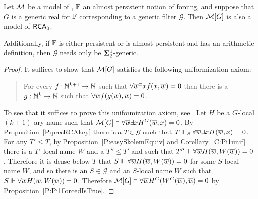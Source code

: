 \begin{thm}\label{T:presRCA}
Let $\mathcal{M}$ be a model of \RCAo, $\mathbb{F}$ an almost persistent notion of forcing,
and suppose that $G$ is a generic real for $\mathbb{F}$
corresponding to a generic filter $\mathcal{G}$.
Then $\mathcal{M}[G]$ is also a model of $\mathsf{RCA}_0$.

Additionally, if $\mathbb{F}$ is either persistent or is almost persistent
and has an arithmetic definition, then $\mathcal{G}$ needs only be
$\mathbf{\Sigma}^1_2$-generic.
\end{thm}
\begin{proof}
It suffices to show that $\mathcal{M}[G]$ satisfies
the following uniformization axiom:
\begin{quote}
For every $f:\mathbb{N}^{k+1}\to\mathbb{N}$ such that $\forall\overline{w}\exists xf(x,\overline{w})=0$
then there is a $g:\mathbb{N}^k\to\mathbb{N}$ such that $\forall\overline{w}f(g(\overline{w}),\overline{w})=0$.
\end{quote}
To see that it suffices to prove this uniformization axiom, see \cite{varMathias}.
Let $H$ be a $G$-local $(k+1)$-ary name such that
$\mathcal{M}[G]\vDash\forall\overline{w}\exists xH^G(\overline{w},x)=0$.
By Proposition~\ref{P:presRCAkey} there is a $T\in\mathcal{G}$
such that $T\Vdash_S \forall\overline{w}\exists xH(\overline{w},x)=0$.
For any $T'\leq T$, by Proposition~\ref{P:easySkolemEquiv} and Corollary~\ref{C:Pi1unif}
there is a $T'$ local name $W$ and a $T''\leq T'$ and  such that
$T''\Vdash \forall\overline{w}H(\overline{w},W(\overline{w}))=0$.
Therefore it is dense below $T$ that
$S\Vdash \forall\overline{w}H(\overline{w},W(\overline{w}))=0$ for some $S$-local name $W$,
and so there is an $S\in\mathcal{G}$ and an $S$-local name $W$ such that
$S\Vdash \forall\overline{w}H(\overline{w},W(\overline{w}))=0$.
Therefore $\mathcal{M}[G]\vDash \forall\overline{w}H^G(W^G(\overline{w}),\overline{w})=0$ by Proposition~\ref{P:Pi1ForcedIsTrue}.
\end{proof}

